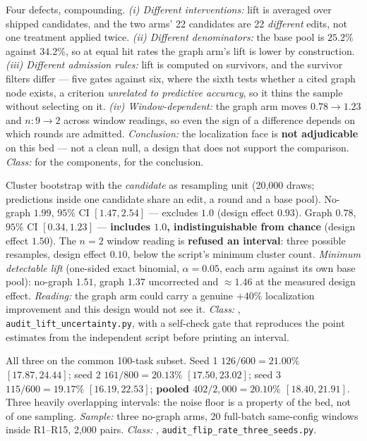\begin{description}[leftmargin=0pt,labelindent=0pt,labelsep=0pt,style=nextline,font=\normalfont,itemsep=6pt]
\item[\textbf{F9c}\quad Why F9a and F9b are not an arm comparison.]
Four defects, compounding. \emph{(i) Different interventions:} lift is
averaged over shipped candidates, and the two arms' 22 candidates are 22
\emph{different} edits, not one treatment applied twice. \emph{(ii)
Different denominators:} the base pool is $25.2\%$ against $34.2\%$, so at
equal hit rates the graph arm's lift is lower by construction.
\emph{(iii) Different admission rules:} lift is computed on survivors, and
the survivor filters differ --- five gates against six, where the sixth
tests whether a cited graph node exists, a criterion \emph{unrelated to
predictive accuracy}, so it thins the sample without selecting on it.
\emph{(iv) Window-dependent:} the graph arm moves $0.78 \to 1.23$ and
$n: 9 \to 2$ across window readings, so even the sign of a difference
depends on which rounds are admitted. \emph{Conclusion:} the localization
face is \textbf{not adjudicable} on this bed --- not a clean null, a design
that does not support the comparison. \emph{Class:}  for the
components,  for the conclusion.

\item[\textbf{F9d}\quad Uncertainty on the lift estimates.]
Cluster bootstrap with the \emph{candidate} as resampling unit (20{,}000
draws; predictions inside one candidate share an edit, a round and a base
pool). No-graph $1.99$, $95\%$ CI $[1.47, 2.54]$ --- excludes $1.0$
(design effect $0.93$). Graph $0.78$, $95\%$ CI $[0.34, 1.23]$ ---
\textbf{includes $1.0$, indistinguishable from chance} (design effect
$1.50$). The $n=2$ window reading is \textbf{refused an interval}: three
possible resamples, design effect $0.10$, below the script's minimum
cluster count. \emph{Minimum detectable lift} (one-sided exact binomial,
$\alpha = 0.05$, each arm against its own base pool): no-graph $1.51$,
graph $1.37$ uncorrected and $\approx 1.46$ at the measured design effect.
\emph{Reading:} the graph arm could carry a genuine $+40\%$ localization
improvement and this design would not see it. \emph{Class:} ,
\texttt{audit\_lift\_uncertainty.py}, with a self-check gate that
reproduces the point estimates from the independent script before printing
an interval.

\item[\textbf{F9e}\quad Wilson intervals on the same-config flip rate,
      three seeds.]
All three on the common 100-task subset. Seed 1 $126/600 = 21.00\%$
$[17.87, 24.44]$; seed 2 $161/800 = 20.13\%$ $[17.50, 23.02]$; seed 3
$115/600 = 19.17\%$ $[16.19, 22.53]$; \textbf{pooled $402/2{,}000 =
20.10\%$ $[18.40, 21.91]$}. Three heavily overlapping intervals: the noise
floor is a property of the bed, not of one sampling. \emph{Sample:} three
no-graph arms, 20 full-batch same-config windows inside R1--R15, 2{,}000
pairs. \emph{Class:} ,
\texttt{audit\_flip\_rate\_three\_seeds.py}.


\end{description}
